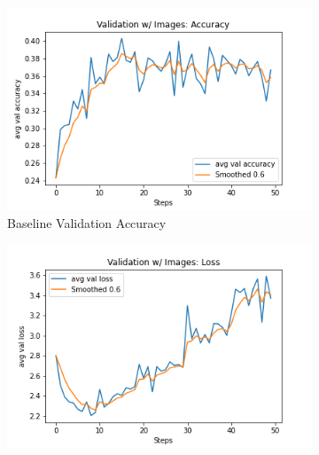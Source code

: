 \begin{figure}[ht!]
     \centering
     \begin{subfigure}[b]{0.3\textwidth}
         \centering
         \includegraphics[width=\textwidth]{./figure/results/baseline_and_blindfolding/images/avg val accuracy.png}
         \caption{Baseline Validation Accuracy} %
         \label{fig:baseline_accuracy}
     \end{subfigure}
     \hfill
     \begin{subfigure}[b]{0.3\textwidth}
         \centering
         \includegraphics[width=\textwidth]{./figure/results/baseline_and_blindfolding/images/avg val loss.png}

\end{subfigure}
\end{figure}
